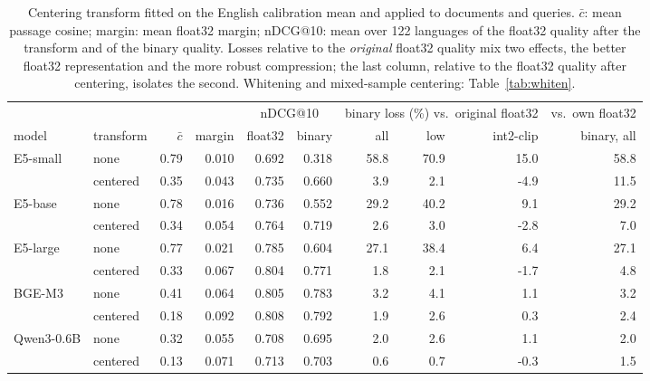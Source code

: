 \begin{table}[t]\centering\footnotesize
\begin{tabular}{llrrrrrrrr}
\toprule
 & & & & \multicolumn{2}{c}{nDCG@10} & \multicolumn{3}{c}{binary loss (\%) vs.\ original float32} & vs.\ own float32 \\
\cmidrule(lr){5-6}\cmidrule(lr){7-9}\cmidrule(lr){10-10}
model & transform & $\bar{c}$ & margin & float32 & binary & all & low & int2-clip & binary, all \\
\midrule
E5-small & none & 0.79 & 0.010 & 0.692 & 0.318 & 58.8 & 70.9 & 15.0 & 58.8 \\
 & centered & 0.35 & 0.043 & 0.735 & 0.660 & 3.9 & 2.1 & -4.9 & 11.5 \\
\midrule
E5-base & none & 0.78 & 0.016 & 0.736 & 0.552 & 29.2 & 40.2 & 9.1 & 29.2 \\
 & centered & 0.34 & 0.054 & 0.764 & 0.719 & 2.6 & 3.0 & -2.8 & 7.0 \\
\midrule
E5-large & none & 0.77 & 0.021 & 0.785 & 0.604 & 27.1 & 38.4 & 6.4 & 27.1 \\
 & centered & 0.33 & 0.067 & 0.804 & 0.771 & 1.8 & 2.1 & -1.7 & 4.8 \\
\midrule
BGE-M3 & none & 0.41 & 0.064 & 0.805 & 0.783 & 3.2 & 4.1 & 1.1 & 3.2 \\
 & centered & 0.18 & 0.092 & 0.808 & 0.792 & 1.9 & 2.6 & 0.3 & 2.4 \\
\midrule
Qwen3-0.6B & none & 0.32 & 0.055 & 0.708 & 0.695 & 2.0 & 2.6 & 1.1 & 2.0 \\
 & centered & 0.13 & 0.071 & 0.713 & 0.703 & 0.6 & 0.7 & -0.3 & 1.5 \\
\bottomrule
\end{tabular}
\caption{Centering transform fitted on the English calibration mean and applied to documents and queries. $\bar{c}$: mean passage cosine; margin: mean float32 margin; nDCG@10: mean over 122 languages of the float32 quality after the transform and of the binary quality. Losses relative to the \emph{original} float32 quality mix two effects, the better float32 representation and the more robust compression; the last column, relative to the float32 quality after centering, isolates the second. Whitening and mixed-sample centering: Table~\ref{tab:whiten}.}\label{tab:centre}
\end{table}
